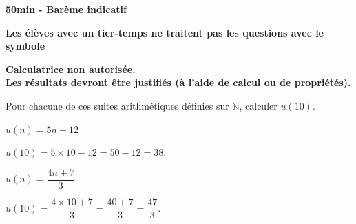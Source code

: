 \documentclass[11pt,a4paper]{article}  %
\begin{document}
	\graphicspath{{images/}}

	\begin{center}
	\end{center}

\begin{center}\textbf{50min - Barème indicatif}\end{center}
\begin{center}\textbf{Les élèves avec un tier-temps ne traitent pas les questions avec  le symbole }\end{center}
\begin{center}\textbf{Calculatrice non autorisée.\\Les résultats devront être justifiés (à l'aide de calcul ou de propriétés).}\end{center}


Pour chacune de ces suites arithmétiques définies sur $\mathbb{N}$, calculer $u(10)$.
\begin{enumMet}
	\item {} $u(n)=5 n-12$
	\par
	\begin{corrBox}
		$u(10)=5\times 10-12=50-12=38$.
	\end{corrBox}

	\item $u(n)=\dfrac{4 n+7}{3}$
	\par
	\begin{corrBox}
		$u(10)=\dfrac{4\times 10+7}{3}=\dfrac{40+7}{3}=\dfrac{47}{3}$.
	\end{corrBox}
\end{enumMet}
\end{document}
